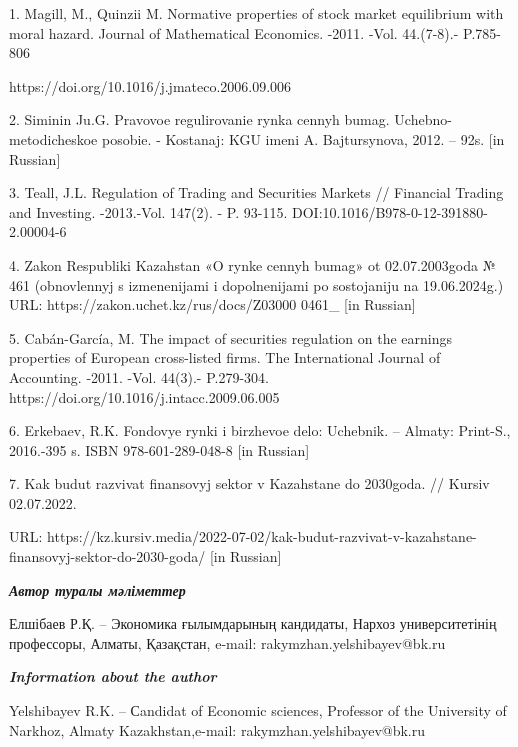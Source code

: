 1. Magill, M., Quinzii M. Normative properties of stock market
equilibrium with moral hazard. Journal of Mathematical Economics. -2011.
-Vol. 44.(7-8).- P.785-806

https://doi.org/10.1016/j.jmateco.2006.09.006

2. Siminin Ju.G. Pravovoe regulirovanie rynka cennyh bumag.
Uchebno-metodicheskoe posobie. - Kostanaj: KGU imeni A. Bajtursynova,
2012. -- 92s. {[}in Russian{]}

3. Teall, J.L. Regulation of Trading and Securities Markets // Financial
Trading and Investing. -2013.-Vol. 147(2). - P. 93-115.
DOI:10.1016/B978-0-12-391880-2.00004-6

4. Zakon Respubliki Kazahstan «O rynke cennyh bumag» ot 02.07.2003goda №
461 (obnovlennyj s izmenenijami i dopolnenijami po sostojaniju na
19.06.2024g.) URL: https://zakon.uchet.kz/rus/docs/Z03000 0461\_ {[}in
Russian{]}

5. Cabán-García, M. The impact of securities regulation on the earnings
properties of European cross-listed firms. The International Journal of
Accounting. -2011. -Vol. 44(3).- P.279-304.
https://doi.org/10.1016/j.intacc.2009.06.005

6. Erkebaev, R.K. Fondovye rynki i birzhevoe delo: Uchebnik. -- Almaty:
Print-S., 2016.-395 s. ISBN 978-601-289-048-8 {[}in Russian{]}

7. Kak budut razvivat\textquotesingle{} finansovyj sektor v Kazahstane
do 2030goda. // Kursiv 02.07.2022.

URL:
https://kz.kursiv.media/2022-07-02/kak-budut-razvivat-v-kazahstane-finansovyj-sektor-do-2030-goda/
{[}in Russian{]}

\emph{{\bfseries Автор туралы мәліметтер}}

Елшібаев Р.Қ. -- Экономика ғылымдарының кандидаты, Нархоз
университетінің профессоры, Алматы, Қазақстан, e-mail:
rakymzhan.yelshibayev@bk.ru

\emph{{\bfseries Information about the author}}

Yelshibayev R.K. -- Сandidat of Economic sciences, Professor of the
University of Narkhoz, Almaty Kazakhstan,e-mail:
rakymzhan.yelshibayev@bk.ru


